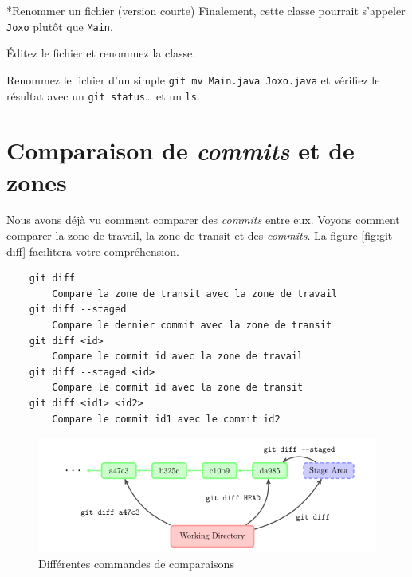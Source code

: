 \documentclass[a4paper,11pt]{style-esi/td}
\begin{document}
\begin{Exercice}*{Renommer un fichier (version courte)}
	Finalement, cette classe pourrait s'appeler \texttt{Joxo} plutôt que 
	\texttt{Main}. 
	\begin{steps}
	
		\item Éditez le fichier et renommez la classe. 
		\item Renommez le fichier d'un simple 
			\texttt{git mv Main.java Joxo.java} et vérifiez le résultat avec un 
			\texttt{git status}… et un \texttt{ls}. 

	\end{steps}
\end{Exercice}



\section{Comparaison de \textit{commits} et de zones}

Nous avons déjà vu comment comparer des \textit{commits} entre eux. Voyons comment
comparer la zone de travail, la zone de transit et des \textit{commits}. La figure \vref{fig:git-diff} facilitera votre compréhension. 

\bigskip
\begin{colxbox}[colback=white,drop fuzzy shadow]
	\begin{verbatim}
	git diff
	    Compare la zone de transit avec la zone de travail
	git diff --staged
	    Compare le dernier commit avec la zone de transit
	git diff <id>
	    Compare le commit id avec la zone de travail
	git diff --staged <id>
	    Compare le commit id avec la zone de transit
	git diff <id1> <id2>
	    Compare le commit id1 avec le commit id2
	\end{verbatim}
\end{colxbox}
\bigskip

\begin{figure}[h]
	\centering
	\includegraphics[width=\linewidth]{img/depot-git-diff.png}
	\caption{Différentes commandes de comparaisons}
	\label{fig:git-diff}
\end{figure}
\end{document}
